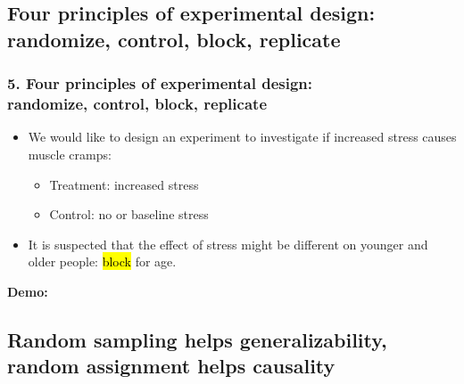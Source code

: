 \documentclass[11pt,containsverbatim,handout,xcolor=xelatex,dvipsnames,table]{beamer}
\begin{document}

\subsection{Four principles of experimental design: randomize, control, block, replicate}
\label{mi5}


\begin{frame}
\frametitle{5. Four principles of experimental design:\\ randomize, control, block, replicate}

\begin{itemize}
\item We would like to design an experiment to investigate if increased stress causes muscle cramps:

\pause

\begin{itemize}
\item Treatment: increased stress
\item Control: no or baseline stress
\end{itemize}

\pause

\item It is suspected that the effect of stress might be different on younger and older people: \hl{block} for age.

\end{itemize}

\pause


\pause

\begin{center}
\textbf{Demo:} 
\end{center}

\end{frame}


\subsection{Random sampling helps generalizability, random assignment helps causality}
\label{mi6}

\end{document}
